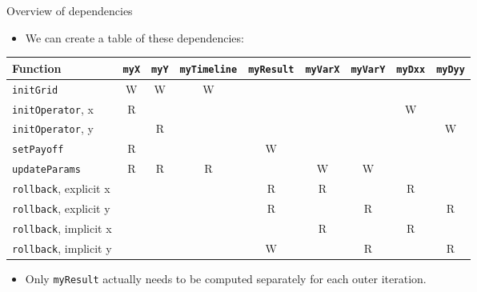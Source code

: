 \documentclass{beamer}
\begin{document}
\begin{frame}[fragile]{Overview of dependencies}
\begin{itemize}
    \item We can create a table of these dependencies:
\end{itemize}
{
\tiny
    \begin{tabular}{lcccccccc}
        \toprule
        \textbf{Function}             & \texttt{myX} & \texttt{myY} & \texttt{myTimeline} & \texttt{myResult} & \texttt{myVarX} & \texttt{myVarY} & \texttt{myDxx} & \texttt{myDyy} \\
        \midrule
        \texttt{initGrid}             & W            & W            & W                   &                   &                 &                 &                &                \\
        \texttt{initOperator}, x      & R            &              &                     &                   &                 &                 & W              &                \\
        \texttt{initOperator}, y      &              & R            &                     &                   &                 &                 &                & W              \\
        \texttt{setPayoff}            & R            &              &                     & W                 &                 &                 &                &                \\
        \texttt{updateParams}         & R            & R            & R                   &                   & W               & W               &                &                \\
        \texttt{rollback}, explicit x &              &              &                     & R                 & R               &                 & R              &                \\
        \texttt{rollback}, explicit y &              &              &                     & R                 &                 & R               &                & R              \\
        \texttt{rollback}, implicit x &              &              &                     &                   & R               &                 & R              &                \\
        \texttt{rollback}, implicit y &              &              &                     & W                 &                 & R               &                & R              \\
        \bottomrule
    \end{tabular}
}
\begin{itemize}
    \item Only \texttt{myResult} actually needs to be computed separately for
          each outer iteration.
\end{itemize}
\end{frame}
\end{document}
